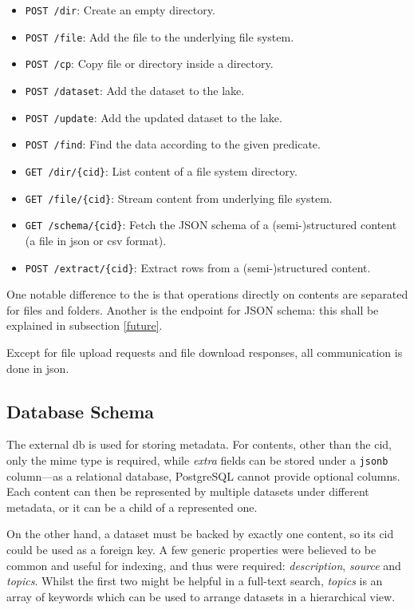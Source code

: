 \begin{itemize}
  \item\verb|POST /dir|: Create an empty directory.
  \item\verb|POST /file|: Add the file to the underlying file system.
  \item\verb|POST /cp|: Copy file or directory inside a directory.
  \item\verb|POST /dataset|: Add the dataset to the lake.
  \item\verb|POST /update|: Add the updated dataset to the lake.
  \item\verb|POST /find|: Find the data according to the given predicate.
  \item\verb|GET /dir/{cid}|: List content of a file system directory.
  \item\verb|GET /file/{cid}|: Stream content from underlying file system.
  \item\verb|GET /schema/{cid}|: Fetch the JSON schema
    of a (semi-)structured content (a file in \gls{json} or \gls{csv} format).
  \item\verb|POST /extract/{cid}|: Extract rows from
    a (semi-)structured content.
\end{itemize}

One notable difference to the  is that operations directly
on contents are separated for files and folders.  Another is the endpoint
for JSON schema: this shall be explained in subsection \ref{future}.

Except for file upload requests and file download responses, all communication
is done in \gls{json}.

\subsection{Database Schema}
The external \gls{db} is used for storing metadata.  For \glspl{content},
other than the \gls{cid}, only the \gls{mime} type is required,
while \emph{extra} fields can be stored under a \verb|jsonb| column---as
a relational database, PostgreSQL cannot provide optional columns.
Each content can then be represented by multiple datasets under
different metadata, or it can be a child of a represented one.

On the other hand, a dataset must be backed by exactly one content,
so its \gls{cid} could be used as a foreign key.  A few generic properties
were believed to be common and useful for indexing, and thus were required:
\emph{description}, \emph{source} and \emph{topics}.  Whilst the first two
might be helpful in a full-text search, \emph{topics} is an array of
keywords which can be used to arrange datasets in a hierarchical view.

